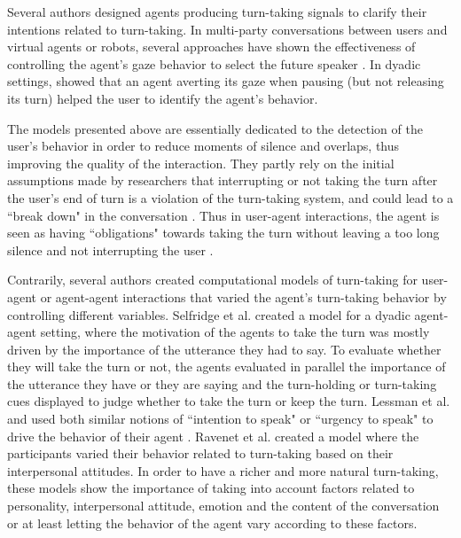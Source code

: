 
Several authors designed agents producing turn-taking signals to clarify their intentions related to turn-taking. In multi-party conversations between users and virtual agents or robots, several approaches have shown the effectiveness of controlling the agent's gaze behavior to select the future speaker \citep{mutlu_storytelling_2006,bohus_facilitating_2010,al_moubayed_regulating_2015}. In dyadic settings, \citep{skantze_turn-taking_2014} showed that an agent averting its gaze when pausing (but not releasing its turn) helped the user to identify the agent's behavior.

The models presented above are essentially dedicated to the detection of the user's behavior in order to reduce moments of silence and overlaps, thus improving the quality of the interaction. 
They partly rely on the initial assumptions made by researchers 
that interrupting or not taking the turn after the user's end of turn 
is a violation of the turn-taking system, and could lead to a ``break
down" in the conversation \citep{cutler_analysis_1986}. 
Thus in user-agent interactions, 
the agent is seen as having ``obligations" towards
taking the turn without leaving a too long silence
and not interrupting the user \citep{de_kok_multimodal_2009}.

Contrarily, several authors created computational models of
turn-taking for user-agent or agent-agent interactions
that varied the agent's turn-taking behavior by controlling 
different variables. 
Selfridge et al. \citep{selfridge_bidding_2009} created a model for a dyadic
agent-agent setting, where the motivation of the agents
to take the turn was mostly driven by the importance
of the utterance they had to say. To evaluate whether they
will take the turn or not, the agents evaluated in parallel
the importance of the utterance they have or they are saying
and the turn-holding or turn-taking cues displayed to
judge whether to take the turn or keep the turn. Lessman et al. \citep{lessmann_towards_2004}and \citep{thorisson_multiparty_2010}
used both similar notions of ``intention to speak" \citep{lessmann_towards_2004} or
``urgency to speak" to drive the behavior of their agent
\citep{thorisson_multiparty_2010}. Ravenet et al. \citep{ravenet_conversational_2015} created a model where the participants varied
their behavior related to turn-taking based on their interpersonal
attitudes. In order to have a richer and more
natural turn-taking, these models show the importance
of taking into account factors related to personality,
interpersonal attitude, emotion and the content of the
conversation or at least letting the behavior of the agent
vary according to these factors.

